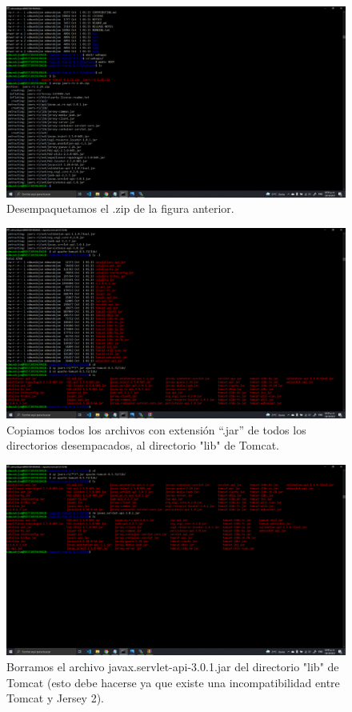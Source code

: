 \documentclass[11pt]{article}
\begin{document}
		\begin{figure}[H]
			\centering
			\includegraphics[scale=0.34]{resources/p7.2.png}
			\caption{Desempaquetamos el .zip de la figura anterior.}\label{fig:picture}
		\end{figure}
		\begin{figure}[H]
			\centering
			\includegraphics[scale=0.34]{resources/p7.3.png}
			\caption{Copiamos todos los archivos con extensión “.jar” de todos los directorios desempacados, al directorio "lib" de Tomcat.}\label{fig:picture}
		\end{figure}
		\begin{figure}[H]
			\centering
			\includegraphics[scale=0.34]{resources/p8.2.png}
			\caption{Borramos el archivo javax.servlet-api-3.0.1.jar del directorio "lib" de Tomcat (esto debe hacerse ya que existe una incompatibilidad entre Tomcat y Jersey 2).}\label{fig:picture}
		\end{figure}
\end{document}
